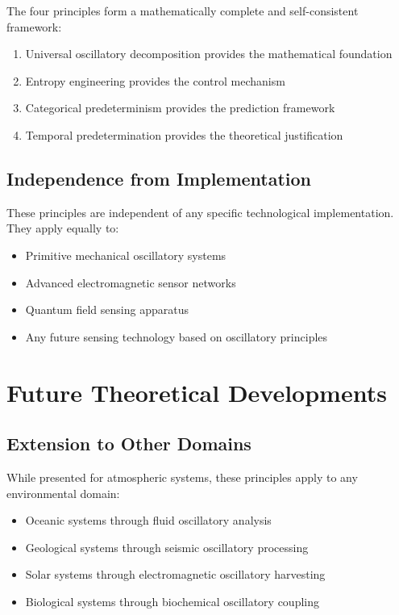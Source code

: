 \documentclass[12pt,a4paper]{article}
\begin{document}
The four principles form a mathematically complete and self-consistent framework:

\begin{enumerate}
\item Universal oscillatory decomposition provides the mathematical foundation
\item Entropy engineering provides the control mechanism
\item Categorical predeterminism provides the prediction framework
\item Temporal predetermination provides the theoretical justification
\end{enumerate}

\subsection{Independence from Implementation}

These principles are independent of any specific technological implementation. They apply equally to:

\begin{itemize}
\item Primitive mechanical oscillatory systems
\item Advanced electromagnetic sensor networks
\item Quantum field sensing apparatus
\item Any future sensing technology based on oscillatory principles
\end{itemize}

\section{Future Theoretical Developments}

\subsection{Extension to Other Domains}

While presented for atmospheric systems, these principles apply to any environmental domain:

\begin{itemize}
\item Oceanic systems through fluid oscillatory analysis
\item Geological systems through seismic oscillatory processing
\item Solar systems through electromagnetic oscillatory harvesting
\item Biological systems through biochemical oscillatory coupling
\end{itemize}
\end{document}
